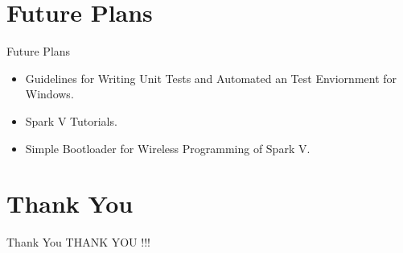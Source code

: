 \documentclass[10pt, a4paper]{beamer}
\begin{document}
\section{Future Plans}
\begin{frame}{Future Plans}
	\begin{itemize}
		\item Guidelines for Writing Unit Tests and Automated an Test Enviornment for Windows.\\
		\item Spark V Tutorials.\\
		\item Simple Bootloader for Wireless Programming of Spark V.\\
	\end{itemize}
\end{frame}


\section{Thank You}
\begin{frame}{Thank You}
	\centering \hspace{3.5cm}THANK YOU !!!
\end{frame}
\end{document}

